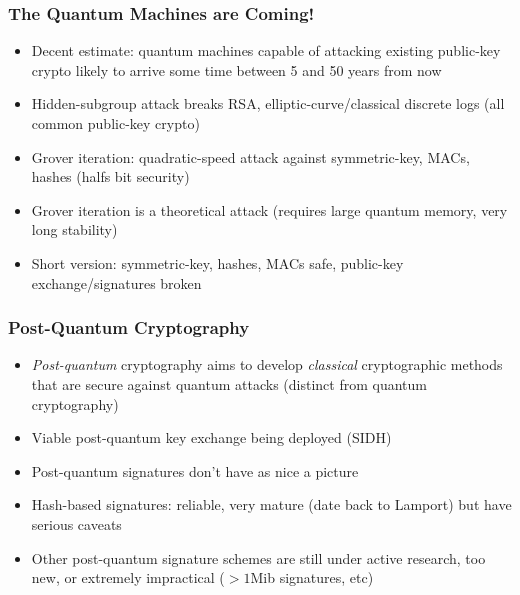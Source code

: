 \documentclass{beamer}
\begin{document}
\begin{frame}
  \frametitle{The Quantum Machines are Coming!}
  \begin{itemize}
  \item Decent estimate: quantum machines capable of attacking
    existing public-key crypto likely to arrive some time between 5
    and 50 years from now
  \item Hidden-subgroup attack breaks RSA, elliptic-curve/classical
    discrete logs (all common public-key crypto)
  \item Grover iteration: quadratic-speed attack against
    symmetric-key, MACs, hashes (halfs bit security)
  \item Grover iteration is a theoretical attack (requires large
    quantum memory, very long stability)
  \item Short version: symmetric-key, hashes, MACs safe, public-key
    exchange/signatures broken
  \end{itemize}
\end{frame}

\begin{frame}
  \frametitle{Post-Quantum Cryptography}
  \begin{itemize}
    \item \emph{Post-quantum} cryptography aims to develop
      \emph{classical} cryptographic methods that are secure against
      quantum attacks (distinct from quantum cryptography)
    \item Viable post-quantum key exchange being deployed (SIDH)
    \item Post-quantum signatures don't have as nice a picture
    \item Hash-based signatures: reliable, very mature (date back to
      Lamport) but have serious caveats
    \item Other post-quantum signature schemes are still under active
      research, too new, or extremely impractical ($>1$Mib signatures,
      etc)
  \end{itemize}
\end{frame}
\end{document}
